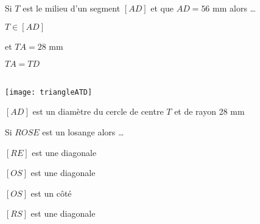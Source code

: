 

\begin{QCM}
  \begin{GroupeQCM}
    \begin{exercice}
      Si $T$ est le milieu d'un segment $[AD]$ et que $AD = 56$ mm alors \ldots
      \begin{ChoixQCM}{4}
      \item $T \in [AD]$
      
      et $TA = 28$ mm
      \item $TA = TD$
      \item \\[-1em]
      \texttt{[image: triangleATD]}
      \item $[AD]$ est un diamètre du cercle de centre $T$ et de rayon 28 mm
      \end{ChoixQCM}
\begin{corrige}
   \end{corrige}
    \end{exercice}

  \begin{exercice}
      Si $ROSE$ est un losange alors \ldots
      \begin{ChoixQCM}{4}
      \item $[RE]$ est une diagonale
      \item $[OS]$ est une diagonale
      \item $[OS]$ est un côté
      \item $[RS]$ est une diagonale
      \end{ChoixQCM}
\begin{corrige}
   \end{corrige}
    \end{exercice}


\end{GroupeQCM}
\end{QCM}

  
